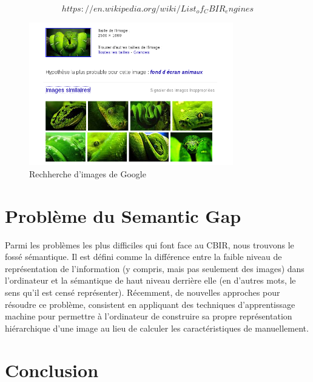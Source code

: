 $$https://en.wikipedia.org/wiki/List_of_CBIR_engines$$

\begin{figure}[H]
	\centering
		\includegraphics[width=3.5in]{Figures/googleImage2.png}
	\caption[An Electron]{Rechherche d'images de Google}
	\label{fig:Electron}
\end{figure}

\section{Problème du Semantic Gap}

	Parmi les problèmes  les plus difficiles qui font face au CBIR, nous trouvons le fossé sémantique. Il est défini comme la différence entre la faible niveau de représentation de l'information (y compris, mais pas seulement des images) dans l'ordinateur et la sémantique de haut niveau derrière elle (en d'autres mots, le sens qu'il est censé représenter).
Récemment, de nouvelles approches pour résoudre ce problème, consistent en appliquant des techniques d'apprentissage machine pour permettre à l'ordinateur de construire sa propre représentation hiérarchique d'une image au lieu de calculer les caractéristiques de manuellement.


\section{Conclusion}

